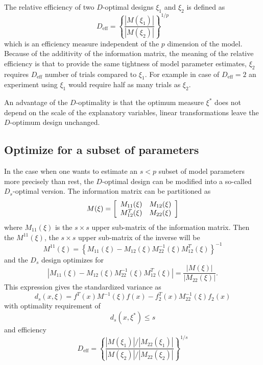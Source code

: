 \documentclass[12pt]{iopart}
\begin{document}
The relative efficiency of two $D$-optimal designs $\xi_1$ and $\xi_2$ is defined as
\begin{equation}
D_\mathrm{eff} = \left\{\frac{|M(\xi_1)|}{|M(\xi_2)|}\right\}^{1/p}
\end{equation}
which is an efficiency measure independent of the $p$ dimension of the model. Because of the additivity of the information matrix, the meaning of the relative efficiency is that to provide the same tightness of model parameter estimates, $\xi_2$ requires $D_\mathrm{eff}$ number of trials compared to $\xi_1$. For example in case of $D_\mathrm{eff} = 2$ an experiment using $\xi_1$ would require half as many trials as $\xi_2$.

An advantage of the $D$-optimality is that the optimum measure $\xi^*$ does not depend on the scale of the explanatory variables, linear transformations leave the $D$-optimum design unchanged.


\subsection{Optimize for a subset of parameters}

In the case when one wants to estimate an $s < p$ subset of model parameters more precisely than rest, the $D$-optimal design can be modified into a so-called $D_s$-optimal version. The information matrix can be partitioned as
\begin{equation}
M(\xi) = \left[
  \begin{array}{l l}
    M_{11}(\xi)   & M_{12}(\xi)\\
    M^T_{12}(\xi) & M_{22}(\xi)
  \end{array} \right]
\end{equation}
where $M_{11}(\xi)$ is the $s \times s$ upper sub-matrix of the information matrix. Then the $M^{11}(\xi)$, the $s \times s$ upper sub-matrix of the inverse will be
\begin{equation}
M^{11}(\xi) = \left\{M_{11}(\xi) - M_{12}(\xi)M^{-1}_{22}(\xi)M^T_{12}(\xi)\right\}^{-1}
\end{equation}
and the $D_s$ design optimizes for 
\begin{equation}
|M_{11}(\xi) - M_{12}(\xi)M^{-1}_{22}(\xi)M^T_{12}(\xi)| = \frac{|M(\xi)|}{|M_{22}(\xi)|}.
\end{equation}
This expression gives the standardized variance as
\begin{equation}
d_s(x, \xi) = f^T(x) M^{-1}(\xi)f(x) - f_2^T(x) M_{22}^{-1}(\xi)f_2(x)
\label{eq:dsvar}
\end{equation}
with optimality requirement of
\begin{equation}
d_s(x, \xi^*) \leq s
\end{equation}
and efficiency
\begin{equation}
D_\mathrm{eff} = \left\{\frac{|M(\xi_1)|/|M_{22}(\xi_1)|}{|M(\xi_2)|/|M_{22}(\xi_2)|}\right\}^{1/s}
\end{equation}
\end{document}
